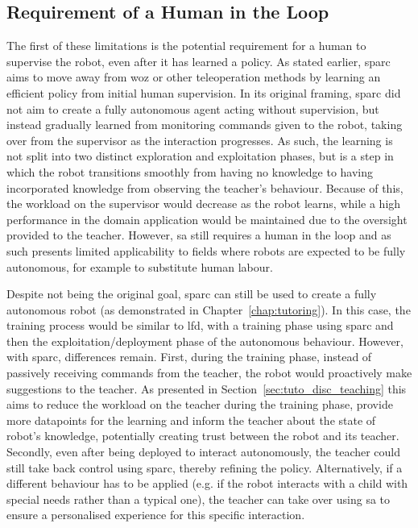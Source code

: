 \subsection{Requirement of a Human in the Loop}

The first of these limitations is the potential requirement for a human to supervise the robot, even after it has learned a policy. As stated earlier, \gls{sparc} aims to move away from \gls{woz} or other teleoperation methods by learning an efficient policy from initial human supervision. In its original framing, \gls{sparc} did not aim to create a fully autonomous agent acting without supervision, but instead gradually learned from monitoring commands given to the robot, taking over from the supervisor as the interaction progresses. As such, the learning is not split into two distinct exploration and exploitation phases, but is a step in which the robot transitions smoothly from having no knowledge to having incorporated knowledge from observing the teacher's behaviour. Because of this, the workload on the supervisor would decrease as the robot learns, while a high performance in the domain application would be maintained due to the oversight provided to the teacher. However, \gls{sa} still requires a human in the loop and as such presents limited applicability to fields where robots are expected to be fully autonomous, for example to substitute human labour. 

Despite not being the original goal, \gls{sparc} can still be used to create a fully autonomous robot (as demonstrated in Chapter~\ref{chap:tutoring}). In this case, the training process would be similar to \gls{lfd}, with a training phase using \gls{sparc} and then the exploitation/deployment phase of the autonomous behaviour. However, with \gls{sparc}, differences remain. First, during the training phase, instead of passively receiving commands from the teacher, the robot would proactively make suggestions to the teacher. As presented in Section~\ref{sec:tuto_disc_teaching} this aims to reduce the workload on the teacher during the training phase, provide more datapoints for the learning and inform the teacher about the state of robot's knowledge, potentially creating trust between the robot and its teacher. Secondly, even after being deployed to interact autonomously, the teacher could still take back control using \gls{sparc}, thereby refining the policy. Alternatively, if a different behaviour has to be applied (e.g. if the robot interacts with a child with special needs rather than a typical one), the teacher can take over using \gls{sa} to ensure a personalised experience for this specific interaction.

